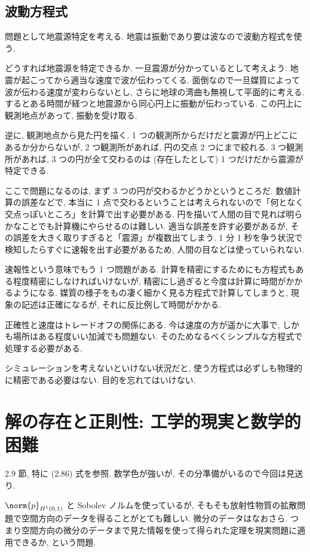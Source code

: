 \documentclass[openany, a4paper, oneside]{jsbook}
\begin{document}
\subsection{波動方程式}

問題として地震源特定を考える.
地震は振動であり要は波なので波動方程式を使う.

どうすれば地震源を特定できるか.
一旦震源が分かっているとして考えよう.
地震が起こってから適当な速度で波が伝わってくる.
面倒なので一旦媒質によって波が伝わる速度が変わらないとし,
さらに地球の湾曲も無視して平面的に考える.
するとある時間が経つと地震源から同心円上に振動が伝わっている.
この円上に観測地点があって, 振動を受け取る.

逆に, 観測地点から見た円を描く.
1 つの観測所からだけだと震源が円上どこにあるか分からないが,
2 つ観測所があれば, 円の交点 2 つにまで絞れる.
3 つ観測所があれば, 3 つの円が全て交わるのは (存在したとして) 1 つだけだから震源が特定できる.

ここで問題になるのは, まず 3 つの円が交わるかどうかというところだ.
数値計算の誤差などで, 本当に 1 点で交わるということは考えられないので「何となく交点っぽいところ」を計算で出す必要がある.
円を描いて人間の目で見れば明らかなことでも計算機にやらせるのは難しい.
適当な誤差を許す必要があるが, その誤差を大きく取りすぎると「震源」が複数出てしまう.
1 分 1 秒を争う状況で検知したらすぐに速報を出す必要があるため, 人間の目などは使っていられない.

速報性という意味でもう 1 つ問題がある.
計算を精密にするためにも方程式もある程度精密にしなければいけないが, 精密にし過ぎると今度は計算に時間がかかるようになる.
媒質の様子をもの凄く細かく見る方程式で計算してしまうと, 現象の記述は正確になるが, それに反比例して時間がかかる.

正確性と速度はトレードオフの関係にある.
今は速度の方が遥かに大事で, しかも場所はある程度いい加減でも問題ない.
そのためなるべくシンプルな方程式で処理する必要がある.

シミュレーションを考えないといけない状況だと, 使う方程式は必ずしも物理的に精密である必要はない.
目的を忘れてはいけない.
\section{解の存在と正則性: 工学的現実と数学的困難}

\cite{NoborizakaOnishiYamamoto1} 2.9 節, 特に (2.86) 式を参照.
数学色が強いが, その分準備がいるので今回は見送り.

$\norm{p}_{H^1 (0,1)}$ と Sobolev ノルムを使っているが,
そもそも放射性物質の拡散問題で空間方向のデータを得ることがとても難しい.
微分のデータはなおさら.
つまり空間方向の微分のデータまで見た情報を使って得られた定理を現実問題に適用できるか, という問題.
\end{document}
